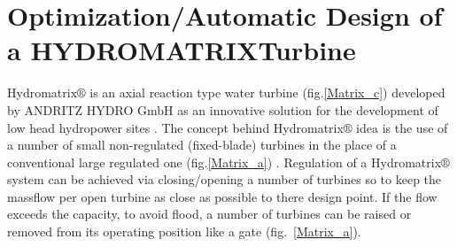 \ifpdf
    \graphicspath{{5/figures/PNG/}{5/figures/PDF/}{5/figures/}}
\else
    \graphicspath{{5/figures/EPS/}{5/figures/}}
\fi

\chapter{Optimization/Automatic Design of a HYDROMATRIX\circledR Turbine} %
Hydromatrix$\circledR$ is an axial reaction type water turbine (fig.\ref{Matrix_c}) developed by ANDRITZ HYDRO GmbH as an innovative solution for the development of low head hydropower sites \cite{matrix,matrix_2}. The concept behind Hydromatrix$\circledR$  idea is the use of a number of small non-regulated (fixed-blade) turbines in the place of a conventional large regulated one (fig.\ref{Matrix_a}) .  Regulation of a Hydromatrix$\circledR$ system can be achieved via closing/opening a number of turbines so to keep the massflow per open turbine as close as possible to there design point. If the flow exceeds the capacity, to avoid flood, a number of turbines can be raised or removed from its operating position like a gate (fig.~\ref{Matrix_a}).  



